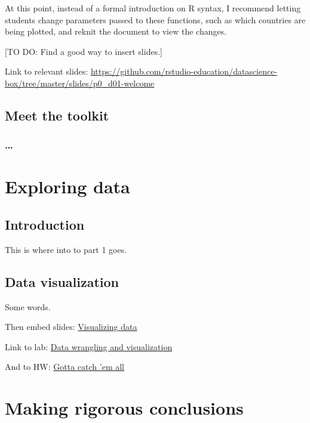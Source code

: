\documentclass[]{book}
\theoremstyle{definition}
\theoremstyle{definition}
\theoremstyle{definition}
\theoremstyle{remark}
\begin{document}
At this point, instead of a formal introduction on R syntax, I recommend
letting students change parameters passed to these functions, such as
which countries are being plotted, and reknit the document to view the
changes.

{[}TO DO: Find a good way to insert slides.{]}

Link to relevant slides:
\url{https://github.com/rstudio-education/datascience-box/tree/master/slides/p0_d01-welcome}

\chapter{Meet the toolkit}\label{toolkit}

\section{\ldots{}}\label{section}

\part{Exploring data}\label{part-exploring-data}

\chapter{Introduction}\label{explore-intro}

This is where into to part 1 goes.

\chapter{Data visualization}\label{data-viz}

Some words.

Then embed slides:
\href{https://github.com/rstudio-education/datascience-box/tree/master/slides/p1_d01-data-viz}{Visualizing
data}

Link to lab:
\href{https://github.com/rstudio-education/datascience-box/blob/master/labs/lab-02-data-wrangle-visualize.Rmd}{Data
wrangling and visualization}

And to HW:
\href{https://github.com/rstudio-education/datascience-box/blob/master/assignments/hw-02.Rmd}{Gotta
catch 'em all}

\part{Making rigorous
conclusions}\label{part-making-rigorous-conclusions}
\end{document}
